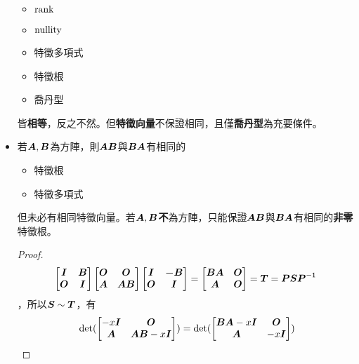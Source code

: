 \begin{itemize}
\begin{itemize}
		\item $\operatorname{rank}$
		\item $\operatorname{nullity}$
		\item 特徵多項式
		\item 特徵根
		\item 喬丹型
	\end{itemize}
    皆\textbf{相等}，反之不然。但\textbf{特徵向量}不保證相同，且僅\textbf{喬丹型}為充要條件。
    \item 若$\boldsymbol{A}, \boldsymbol{B}$為方陣，則$\boldsymbol{AB}$與$\boldsymbol{BA}$有相同的
	\begin{itemize}
		\item 特徵根
		\item 特徵多項式
	\end{itemize}
	但未必有相同特徵向量。若$\boldsymbol{A}, \boldsymbol{B}$\textbf{不}為方陣，只能保證$\boldsymbol{AB}$與$\boldsymbol{BA}$有相同的\textbf{非零}特徵根。 \\
	\begin{proof} \begin{equation}
			\begin{bmatrix}
				\boldsymbol{I} & \boldsymbol{B} \\
				\boldsymbol{O} & \boldsymbol{I}
			\end{bmatrix}
			\begin{bmatrix}
				\boldsymbol{O} & \boldsymbol{O} \\
				\boldsymbol{A} & \boldsymbol{AB}
			\end{bmatrix}
			\begin{bmatrix}
				\boldsymbol{I} & \boldsymbol{-B} \\
				\boldsymbol{O} & \boldsymbol{I}
			\end{bmatrix} = 
			\begin{bmatrix}
				\boldsymbol{BA} & \boldsymbol{O} \\
				\boldsymbol{A} & \boldsymbol{O}
			\end{bmatrix} = \boldsymbol{T} = \boldsymbol{P}\boldsymbol{S}\boldsymbol{P}^{\mathsf{-1}}
		\end{equation}，所以$\boldsymbol{S} \sim \boldsymbol{T}$，有\begin{equation}
			\begin{aligned} 
				& \det(\begin{bmatrix}
					-x\mat{I} & \mat{O} \\
					\mat{A} & \mat{AB} - x\mat{I}
				\end{bmatrix}) = 
				\det(\begin{bmatrix}
					\mat{BA} - x\mat{I} & \mat{O} \\
					\mat{A} & -x\mat{I}
				\end{bmatrix}) \\

\end{aligned}
\end{equation}
\end{proof}
\end{itemize}
